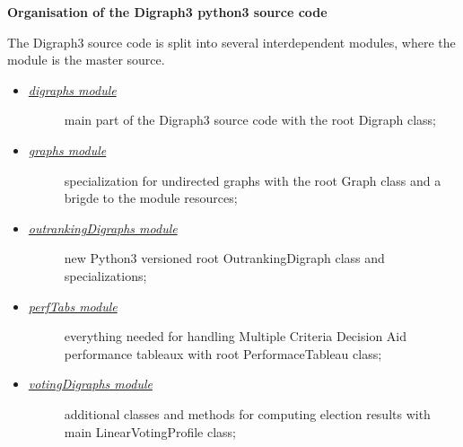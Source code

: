 \documentclass[letterpaper,10pt,english]{sphinxmanual}
\begin{document}
\textbf{Organisation of the Digraph3 python3 source code}

The Digraph3 source code is split into several interdependent modules, where the  module is the master source.
\begin{itemize}
\item {} \begin{description}
\item[{{\hyperref[techDoc:digraphs-label]{\emph{digraphs module}}}}] \leavevmode
main part of the Digraph3 source code with the root Digraph class;

\end{description}

\item {} \begin{description}
\item[{{\hyperref[techDoc:graphs-label]{\emph{graphs module}}}}] \leavevmode
specialization for undirected graphs with the root Graph class and a brigde to the  module resources;

\end{description}

\item {} \begin{description}
\item[{{\hyperref[techDoc:outrankingdigraphs-label]{\emph{outrankingDigraphs module}}}}] \leavevmode
new Python3 versioned root OutrankingDigraph class and specializations;

\end{description}

\item {} \begin{description}
\item[{{\hyperref[techDoc:perftabs-label]{\emph{perfTabs module}}}}] \leavevmode
everything needed for handling Multiple Criteria Decision Aid performance tableaux with root PerformaceTableau class;

\end{description}

\item {} \begin{description}
\item[{{\hyperref[techDoc:votingdigraphs-label]{\emph{votingDigraphs module}}}}] \leavevmode
additional classes and methods for computing election results with main LinearVotingProfile class;

\end{description}


\end{itemize}
\end{document}
